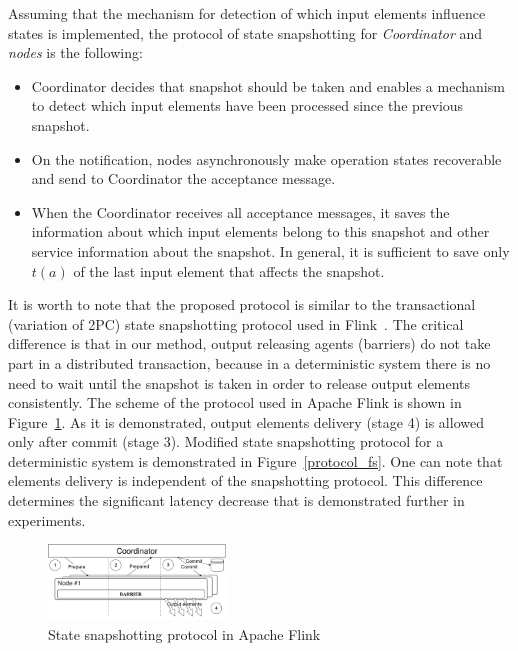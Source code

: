 Assuming that the mechanism for detection of which input elements influence states is implemented, the protocol of state snapshotting for {\em Coordinator} and {\em nodes} is the following:

\begin{itemize}
    \item Coordinator decides that snapshot should be taken and enables a mechanism to detect which input elements have been processed since the previous snapshot.
    \item On the notification, nodes asynchronously make operation states recoverable and send to Coordinator the acceptance message.
    \item When the Coordinator receives all acceptance messages, it saves the information about which input elements belong to this snapshot and other service information about the snapshot. In general, it is sufficient to save only $t(a)$ of the last input element that affects the snapshot.
\end{itemize}

It is worth to note that the proposed protocol is similar to the transactional (variation of 2PC) state snapshotting protocol used in Flink~\cite{Carbone:2017:SMA:3137765.3137777}. The critical difference is that in our method, output releasing agents (barriers) do not take part in a distributed transaction, because in a deterministic system there is no need to wait until the snapshot is taken in order to release output elements consistently. The scheme of the protocol used in Apache Flink is shown in Figure~\ref{protocol_flink}. As it is demonstrated, output elements delivery (stage 4) is allowed only after commit (stage 3). Modified state snapshotting protocol for a deterministic system is demonstrated in Figure~\ref{protocol_fs}. One can note that elements delivery is independent of the snapshotting protocol. This difference determines the significant latency decrease that is demonstrated further in experiments.

\begin{figure}[htbp]
  \centering
  \includegraphics[width=0.42\textwidth]{pics/protocol-flink}
  \caption{State snapshotting protocol in Apache Flink}
  \label{protocol_flink}
\end{figure}

